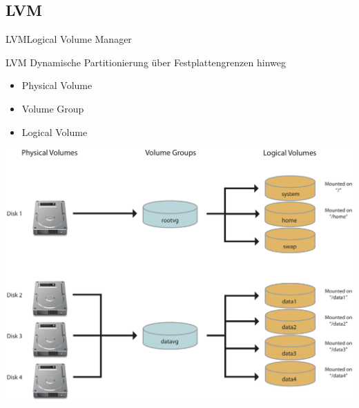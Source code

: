 \documentclass[pdflatex, ngerman, handout]{beamer}
\begin{document}
\subsection{LVM}

\begin{frame}{LVM}{Logical Volume Manager}
\begin{block}{LVM}
Dynamische Partitionierung über Festplattengrenzen hinweg

\begin{itemize}
	\item Physical Volume
	\item Volume Group
	\item Logical Volume
\end{itemize}
\end{block}
\end{frame}

\begin{frame}[plain]%
	\centering\colorbox{white}{\includegraphics[height=0.9\textheight]{LVM}}

\end{frame}
\end{document}

